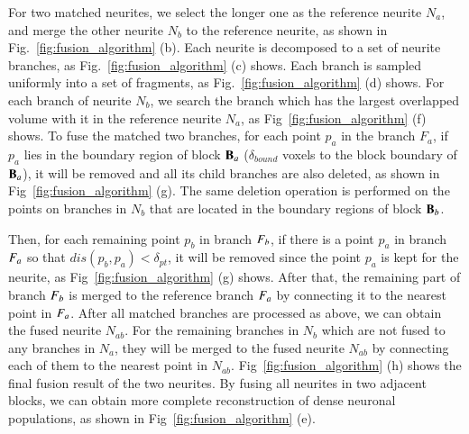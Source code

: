 For two matched neurites, we select the longer one as the reference neurite $N_a$, and merge the other neurite $N_b$ to the reference neurite, as shown in Fig.~\ref{fig:fusion_algorithm} (b).
%
Each neurite is decomposed to a set of neurite branches, as Fig.~\ref{fig:fusion_algorithm} (c) shows.
Each branch is sampled uniformly into a set of fragments, as Fig.~\ref{fig:fusion_algorithm} (d) shows.
%
For each branch of neurite $N_b$, we search the branch which has the largest overlapped volume with it in the reference neurite $N_a$, as Fig~\ref{fig:fusion_algorithm} (f) shows.
To fuse the matched two branches, for each point $p_a$ in the branch $F_a$, if $p_a$ lies in the boundary region of block $\mathbf{B}_a$ ($\delta_{bound}$ voxels to the block boundary of $\mathbf{B}_a$), it will be removed and all its child branches are also deleted, as shown in Fig~\ref{fig:fusion_algorithm} (g).  
The same deletion operation is performed on the points on branches in $N_b$ that are located in the boundary regions of block $\mathbf{B}_b$.


Then, for each remaining point $p_b$ in branch $F_b$, if there is a point $p_a$ in branch $F_a$ so that $dis(p_b,p_a)<\delta_{pt}$, it will be removed since the point $p_a$ is kept for the neurite, as Fig~\ref{fig:fusion_algorithm} (g) shows.
%
After that, the remaining part of branch $F_b$ is merged to the reference branch $F_a$ by connecting it to the nearest point in $F_a$.
After all matched branches are processed as above, we can obtain the fused neurite $N_{ab}$.
%
For the remaining branches in $N_b$ which are not fused to any branches in $N_a$, they will be merged to the fused neurite $N_{ab}$ by connecting each of them to the nearest point in $N_{ab}$.
%
Fig~\ref{fig:fusion_algorithm} (h) shows the final fusion result of the two neurites. 
By fusing all neurites in two adjacent blocks, we can obtain more complete reconstruction of dense neuronal populations, as shown in Fig~\ref{fig:fusion_algorithm} (e).


